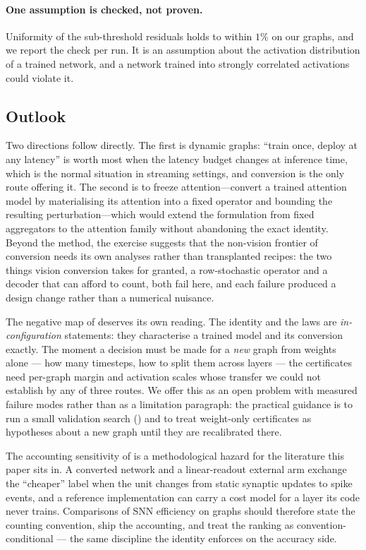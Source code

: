 \paragraph{One assumption is checked, not proven.} Uniformity of the sub-threshold residuals holds to
within $1\%$ on our graphs, and we report the check per run. It is an assumption about the activation
distribution of a trained network, and a network trained into strongly correlated activations could
violate it.

\subsection{Outlook}
\label{sec:outlook}

Two directions follow directly. The first is dynamic graphs: ``train once, deploy at any latency'' is
worth most when the latency budget changes at inference time, which is the normal situation in
streaming settings, and conversion is the only route offering it. The second is to freeze
attention---convert a trained attention model by materialising its attention into a fixed operator
and bounding the resulting perturbation---which would extend the formulation from fixed aggregators
to the attention family without abandoning the exact identity. Beyond the method, the exercise
suggests that the non-vision frontier of conversion needs its own analyses rather than transplanted
recipes: the two things vision conversion takes for granted, a row-stochastic operator and a decoder
that can afford to count, both fail here, and each failure produced a design change rather than a
numerical nuisance.

The negative map of  deserves its own reading. The identity and the laws are
\emph{in-configuration} statements: they characterise a trained model and its conversion exactly.
The moment a decision must be made for a \emph{new} graph from weights alone --- how many timesteps,
how to split them across layers --- the certificates need per-graph margin and activation scales
whose transfer we could not establish by any of three routes. We offer this as an open problem with
measured failure modes rather than as a limitation paragraph: the practical guidance is to run a
small validation search () and to treat weight-only certificates as
hypotheses about a new graph until they are recalibrated there.

The accounting sensitivity of  is a methodological hazard for the
literature this paper sits in. A converted network and a linear-readout external arm exchange the
``cheaper'' label when the unit changes from static synaptic updates to spike events, and a
reference implementation can carry a cost model for a layer its code never trains. Comparisons of
SNN efficiency on graphs should therefore state the counting convention, ship the accounting, and
treat the ranking as convention-conditional --- the same discipline the identity enforces on the
accuracy side.
